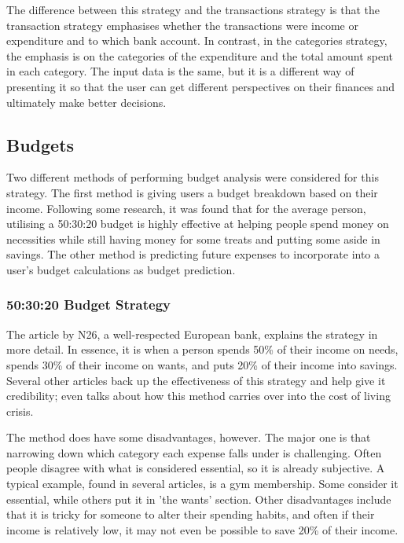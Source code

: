 The difference between this strategy and the transactions strategy is that the transaction strategy emphasises whether the transactions were income or expenditure and to which bank account. In contrast, in the categories strategy, the emphasis is on the categories of the expenditure and the total amount spent in each category. The input data is the same, but it is a different way of presenting it so that the user can get different perspectives on their finances and ultimately make better decisions.

\subsection{Budgets}
Two different methods of performing budget analysis were considered for this strategy. The first method is giving users a budget breakdown based on their income. Following some research, it was found that for the average person, utilising a 50:30:20 budget is highly effective at helping people spend money on necessities while still having money for some treats and putting some aside in savings. The other method is predicting future expenses to incorporate into a user's budget calculations as budget prediction.

\subsubsection{50:30:20 Budget Strategy}

The article \cite{503020Strategy} by N26, a well-respected European bank, explains the strategy in more detail. In essence, it is when a person spends 50\% of their income on needs, spends 30\% of their income on wants, and puts 20\% of their income into savings. Several other articles back up the effectiveness of this strategy and help give it credibility; \cite{503020InCostLivingCrisis} even talks about how this method carries over into the cost of living crisis.

The method does have some disadvantages, however. The major one is that narrowing down which category each expense falls under is challenging. Often people disagree with what is considered essential, so it is already subjective. A typical example, found in several articles, is a gym membership. Some consider it essential, while others put it in 'the wants' section. Other disadvantages include that it is tricky for someone to alter their spending habits, and often if their income is relatively low, it may not even be possible to save 20\% of their income.

